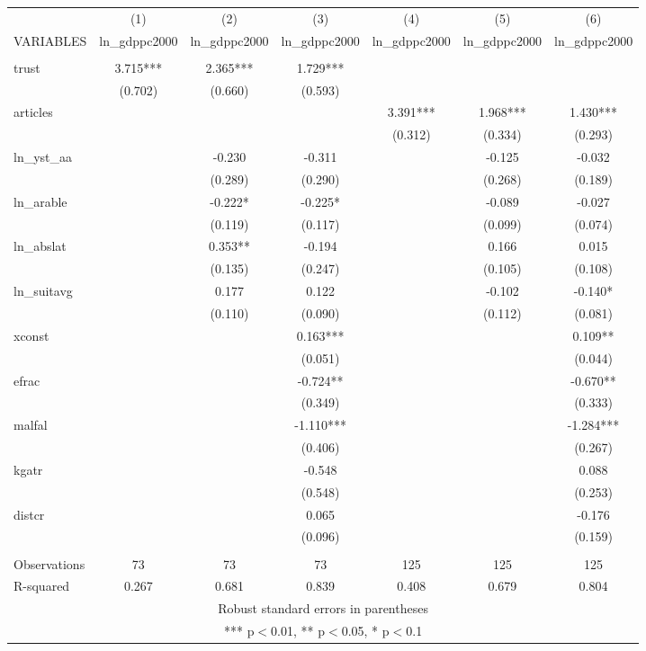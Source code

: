 \documentclass[]{article}
\begin{document}
\begin{tabular}{lcccccc} \hline
 & (1) & (2) & (3) & (4) & (5) & (6) \\
VARIABLES & ln\_gdppc2000 & ln\_gdppc2000 & ln\_gdppc2000 & ln\_gdppc2000 & ln\_gdppc2000 & ln\_gdppc2000 \\ \hline
 &  &  &  &  &  &  \\
trust & 3.715*** & 2.365*** & 1.729*** &  &  &  \\
 & (0.702) & (0.660) & (0.593) &  &  &  \\
articles &  &  &  & 3.391*** & 1.968*** & 1.430*** \\
 &  &  &  & (0.312) & (0.334) & (0.293) \\
ln\_yst\_aa &  & -0.230 & -0.311 &  & -0.125 & -0.032 \\
 &  & (0.289) & (0.290) &  & (0.268) & (0.189) \\
ln\_arable &  & -0.222* & -0.225* &  & -0.089 & -0.027 \\
 &  & (0.119) & (0.117) &  & (0.099) & (0.074) \\
ln\_abslat &  & 0.353** & -0.194 &  & 0.166 & 0.015 \\
 &  & (0.135) & (0.247) &  & (0.105) & (0.108) \\
ln\_suitavg &  & 0.177 & 0.122 &  & -0.102 & -0.140* \\
 &  & (0.110) & (0.090) &  & (0.112) & (0.081) \\
xconst &  &  & 0.163*** &  &  & 0.109** \\
 &  &  & (0.051) &  &  & (0.044) \\
efrac &  &  & -0.724** &  &  & -0.670** \\
 &  &  & (0.349) &  &  & (0.333) \\
malfal &  &  & -1.110*** &  &  & -1.284*** \\
 &  &  & (0.406) &  &  & (0.267) \\
kgatr &  &  & -0.548 &  &  & 0.088 \\
 &  &  & (0.548) &  &  & (0.253) \\
distcr &  &  & 0.065 &  &  & -0.176 \\
 &  &  & (0.096) &  &  & (0.159) \\
 &  &  &  &  &  &  \\
Observations & 73 & 73 & 73 & 125 & 125 & 125 \\
 R-squared & 0.267 & 0.681 & 0.839 & 0.408 & 0.679 & 0.804 \\ \hline
\multicolumn{7}{c}{ Robust standard errors in parentheses} \\
\multicolumn{7}{c}{ *** p$<$0.01, ** p$<$0.05, * p$<$0.1} \\
\end{tabular}
\end{document}
